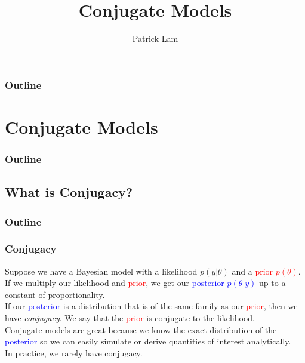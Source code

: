 \documentclass{beamer}
\author{Patrick Lam}
\title{Conjugate Models}
\date{}
\begin{document}
\newcommand{\red}{\textcolor{red}}
\newcommand{\blue}{\textcolor{blue}}
\newcommand{\purple}{\textcolor{purple}}

\frame{\titlepage}

\begin{frame}
\frametitle{Outline}
\tableofcontents
\end{frame}

\section{Conjugate Models}

\begin{frame}
\frametitle{Outline}
\tableofcontents[currentsection]
\end{frame}

\subsection{What is Conjugacy?}

\begin{frame}
\frametitle{Outline}
\tableofcontents[currentsubsection]
\end{frame}

\begin{frame}
\frametitle{Conjugacy}
\pause
Suppose we have a Bayesian model with a likelihood $p(y | \theta)$ and
a \red{prior $p(\theta)$}.\\
\pause
\bigskip
If we multiply our likelihood and \red{prior}, we get our \blue{posterior
$p(\theta | y)$} up to a constant of proportionality.\\
\pause
\bigskip
If our \blue{posterior} is a distribution that is of the same family as our
\red{prior}, then we have \textit{conjugacy}.  \pause We say that the
\red{prior} is conjugate to the likelihood.\\
\pause
\bigskip
Conjugate models are great because we know the exact distribution of
the \blue{posterior} so we can easily simulate or derive quantities of
interest analytically.\\
\pause
\bigskip
In practice, we rarely have conjugacy.
\end{frame}
\end{document}
